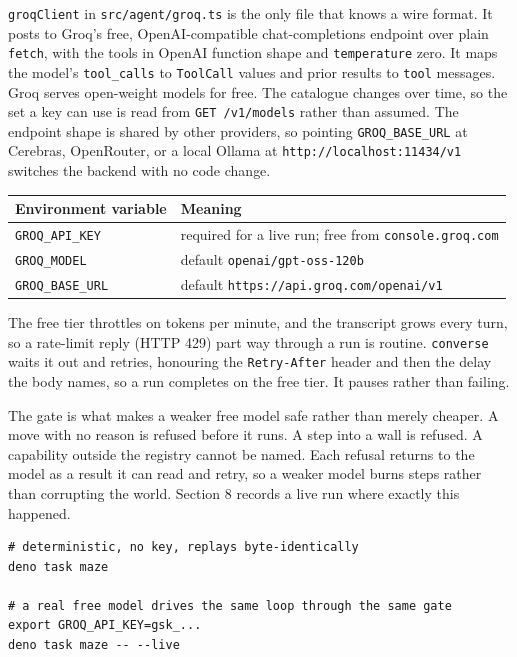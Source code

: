 \documentclass[11pt]{article}
\newcommand{\code}[1]{\texttt{#1}}
\begin{document}
\code{groqClient} in \code{src/agent/groq.ts} is the only file that knows a wire
format. It posts to Groq's free, OpenAI-compatible chat-completions endpoint over
plain \code{fetch}, with the tools in OpenAI function shape and
\code{temperature} zero. It maps the model's \code{tool\_calls} to
\code{ToolCall} values and prior results to \code{tool} messages. Groq serves
open-weight models for free. The catalogue changes over time, so the set a key
can use is read from \code{GET /v1/models} rather than assumed. The endpoint
shape is shared by other providers, so pointing \code{GROQ\_BASE\_URL} at
Cerebras, OpenRouter, or a local Ollama at \code{http://localhost:11434/v1}
switches the backend with no code change.

\begin{center}
\begin{tabularx}{\linewidth}{@{}l X@{}}
\toprule
\textbf{Environment variable} & \textbf{Meaning} \\
\midrule
\code{GROQ\_API\_KEY} & required for a live run; free from \code{console.groq.com} \\
\code{GROQ\_MODEL} & default \code{openai/gpt-oss-120b} \\
\code{GROQ\_BASE\_URL} & default \code{https://api.groq.com/openai/v1} \\
\bottomrule
\end{tabularx}
\end{center}

The free tier throttles on tokens per minute, and the transcript grows every
turn, so a rate-limit reply (HTTP 429) part way through a run is routine.
\code{converse} waits it out and retries, honouring the \code{Retry-After}
header and then the delay the body names, so a run completes on the free tier.
It pauses rather than failing.

The gate is what makes a weaker free model safe rather than merely cheaper. A
move with no reason is refused before it runs. A step into a wall is refused. A
capability outside the registry cannot be named. Each refusal returns to the
model as a result it can read and retry, so a weaker model burns steps rather
than corrupting the world. Section 8 records a live run where exactly this
happened.

\begin{lstlisting}
# deterministic, no key, replays byte-identically
deno task maze

# a real free model drives the same loop through the same gate
export GROQ_API_KEY=gsk_...
deno task maze -- --live
\end{lstlisting}
\end{document}
